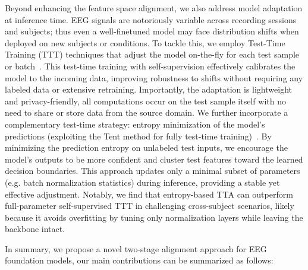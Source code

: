 \documentclass{article} %
\begin{document}
Beyond enhancing the feature space alignment, we also address model adaptation at inference time. EEG signals are notoriously variable across recording sessions and subjects\citep{corsi2007within}; thus even a well-finetuned model may face distribution shifts when deployed on new subjects or conditions. To tackle this, we employ Test-Time Training (TTT) techniques that adjust the model on-the-fly for each test sample or batch~\citep{sun2019test,sun2020test}. 
This test-time training with self-supervision effectively calibrates the model to the incoming data, improving robustness to shifts without requiring any labeled data or extensive retraining. Importantly, the adaptation is lightweight and privacy-friendly, all computations occur on the test sample itself with no need to share or store data from the source domain.
We further incorporate a complementary test-time strategy: entropy minimization of the model’s predictions (exploiting the Tent method for fully test-time training)~\citep{wang2020tent}. By minimizing the prediction entropy on unlabeled test inputs, we encourage the model’s outputs to be more confident and cluster test features toward the learned decision boundaries. This approach updates only a minimal subset of parameters (e.g. batch normalization statistics) during inference, providing a stable yet effective adjustment. Notably, we find that entropy-based TTA can outperform full-parameter self-supervised TTT in challenging cross-subject scenarios, likely because it avoids overfitting by tuning only normalization layers while leaving the backbone intact.

In summary, we propose a novel two-stage alignment approach for EEG foundation models, our main contributions can be summarized as follows:
\end{document}
